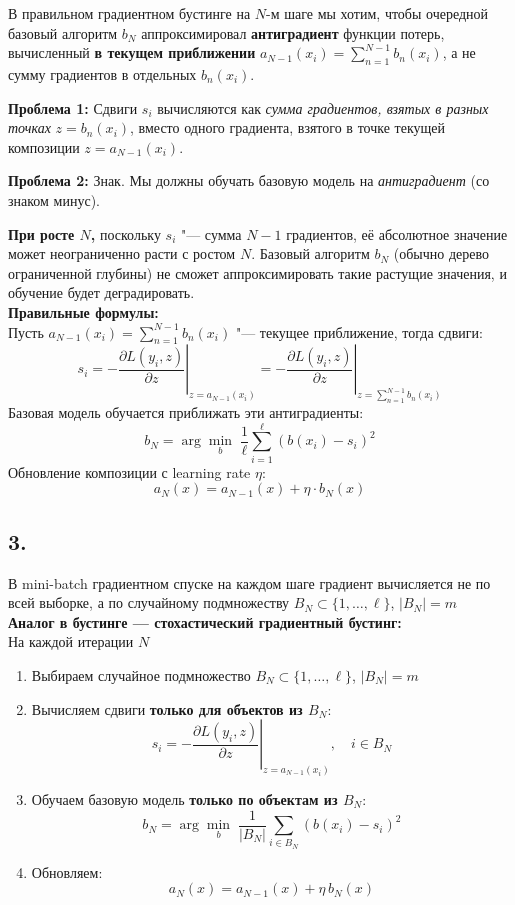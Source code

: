 \documentclass[12pt,a4paper]{article}
\begin{document}
В правильном градиентном бустинге на $N$-м шаге мы хотим, чтобы
очередной базовый алгоритм $b_N$ аппроксимировал \textbf{антиградиент}
функции потерь, вычисленный \textbf{в текущем приближении}
$a_{N-1}(x_i) = \sum_{n=1}^{N-1} b_n(x_i)$, а не сумму градиентов
в отдельных $b_n(x_i)$.

\textbf{Проблема 1:} Сдвиги $s_i$ вычисляются как \emph{сумма градиентов,
взятых в разных точках} $z = b_n(x_i)$, вместо одного градиента,
взятого в точке текущей композиции $z = a_{N-1}(x_i)$.

\textbf{Проблема 2:} Знак. Мы должны обучать базовую модель на
\emph{антиградиент} (со знаком минус).

\textbf{При росте $N$,} поскольку $s_i$ "--- сумма $N-1$ градиентов, её абсолютное значение
может неограниченно расти с ростом $N$. Базовый алгоритм $b_N$
(обычно дерево ограниченной глубины) не сможет аппроксимировать
такие растущие значения, и обучение будет деградировать.\\[1mm]
\textbf{Правильные формулы:}\\[1mm]
Пусть $a_{N-1}(x_i) = \sum_{n=1}^{N-1} b_n(x_i)$ "--- текущее
приближение, тогда сдвиги:
\[
s_i = -\left.\frac{\partial L(y_i, z)}{\partial z}
\right|_{z = a_{N-1}(x_i)}
= -\left.\frac{\partial L(y_i, z)}{\partial z}
\right|_{z = \sum_{n=1}^{N-1} b_n(x_i)}
\]
Базовая модель обучается приближать эти антиградиенты:
\[
b_N = \arg\min_{b}\; \frac{1}{\ell}\sum_{i=1}^{\ell}(b(x_i) - s_i)^2
\]
Обновление композиции с learning rate $\eta$:
\[
a_N(x) = a_{N-1}(x) + \eta \cdot b_N(x)
\]

\subsection*{3.}

В mini-batch градиентном спуске на каждом шаге градиент вычисляется не
по всей выборке, а по случайному подмножеству
$B_N \subset \{1,\ldots,\ell\}$, $|B_N| = m$\\[1mm]
\textbf{Аналог в бустинге --- стохастический градиентный бустинг:}\\[1mm]
На каждой итерации $N$
\begin{enumerate}
    \item Выбираем случайное подмножество
    $B_N \subset \{1,\ldots,\ell\}$, $|B_N| = m$

    \item Вычисляем сдвиги \textbf{только для объектов из $B_N$}:
    \[
    s_i = -\left.\frac{\partial L(y_i, z)}{\partial z}
    \right|_{z = a_{N-1}(x_i)}, \quad i \in B_N
    \]

    \item Обучаем базовую модель \textbf{только по объектам из $B_N$}:
    \[
    b_N = \arg\min_{b}\; \frac{1}{|B_N|}\sum_{i \in B_N}(b(x_i) - s_i)^2
    \]

    \item Обновляем:
    \[
    a_N(x) = a_{N-1}(x) + \eta\, b_N(x)
    \]
\end{enumerate}
\end{document}
